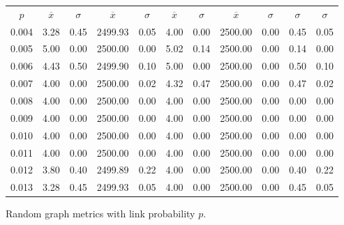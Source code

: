 \documentclass{article}
\begin{document}
\begin{figure}[h]
\begin{center}
\begin{tabular}{|r|rr|rr|rr|rr|rr|}
\hline
\multicolumn{1}{|c|}{$p$} & \multicolumn{1}{|c}{$\overline{x}$} & \multicolumn{1}{c|}{$\sigma$} & \multicolumn{1}{|c}{$\overline{x}$} & \multicolumn{1}{c|}{$\sigma$} & \multicolumn{1}{|c}{$\overline{x}$} & \multicolumn{1}{c|}{$\sigma$} & \multicolumn{1}{|c}{$\overline{x}$} & \multicolumn{1}{c|}{$\sigma$} & \multicolumn{1}{|c}{$\sigma$} & \multicolumn{1}{c|}{$\sigma$}\\
0.004 & 3.28 & 0.45 & 2499.93 & 0.05 & 4.00 & 0.00 & 2500.00 & 0.00 & 0.45 & 0.05\\
0.005 & 5.00 & 0.00 & 2500.00 & 0.00 & 5.02 & 0.14 & 2500.00 & 0.00 & 0.14 & 0.00\\
0.006 & 4.43 & 0.50 & 2499.90 & 0.10 & 5.00 & 0.00 & 2500.00 & 0.00 & 0.50 & 0.10\\
0.007 & 4.00 & 0.00 & 2500.00 & 0.02 & 4.32 & 0.47 & 2500.00 & 0.00 & 0.47 & 0.02\\
0.008 & 4.00 & 0.00 & 2500.00 & 0.00 & 4.00 & 0.00 & 2500.00 & 0.00 & 0.00 & 0.00\\
0.009 & 4.00 & 0.00 & 2500.00 & 0.00 & 4.00 & 0.00 & 2500.00 & 0.00 & 0.00 & 0.00\\
0.010 & 4.00 & 0.00 & 2500.00 & 0.00 & 4.00 & 0.00 & 2500.00 & 0.00 & 0.00 & 0.00\\
0.011 & 4.00 & 0.00 & 2500.00 & 0.00 & 4.00 & 0.00 & 2500.00 & 0.00 & 0.00 & 0.00\\
0.012 & 3.80 & 0.40 & 2499.89 & 0.22 & 4.00 & 0.00 & 2500.00 & 0.00 & 0.40 & 0.22\\
0.013 & 3.28 & 0.45 & 2499.93 & 0.05 & 4.00 & 0.00 & 2500.00 & 0.00 & 0.45 & 0.05\\
\hline
\end{tabular}
\caption{Random graph metrics with link probability $p$.}
\label{exp_random}
\end{center}
\end{figure}
\end{document}
